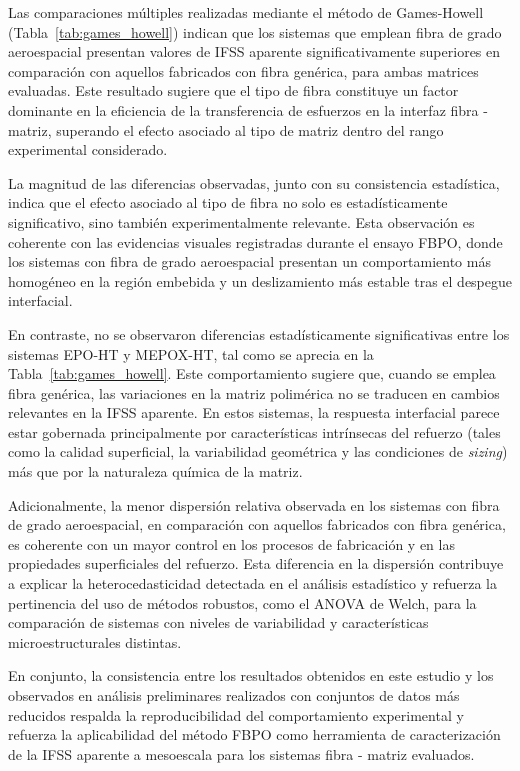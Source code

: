 Las comparaciones múltiples realizadas mediante el método de Games-Howell
(Tabla~\ref{tab:games_howell}) indican que los sistemas que emplean fibra de grado aeroespacial
presentan valores de IFSS aparente significativamente superiores en comparación con aquellos
fabricados con fibra genérica, para ambas matrices evaluadas. Este resultado sugiere que el tipo
de fibra constituye un factor dominante en la eficiencia de la transferencia de esfuerzos en la
interfaz fibra - matriz, superando el efecto asociado al tipo de matriz dentro del rango
experimental considerado.

La magnitud de las diferencias observadas, junto con su consistencia estadística, indica que el
efecto asociado al tipo de fibra no solo es estadísticamente significativo, sino también
experimentalmente relevante. Esta observación es coherente con las evidencias visuales
registradas durante el ensayo FBPO, donde los sistemas con fibra de grado aeroespacial presentan
un comportamiento más homogéneo en la región embebida y un deslizamiento más estable tras el
despegue interfacial.

En contraste, no se observaron diferencias estadísticamente significativas entre los sistemas
EPO-HT y MEPOX-HT, tal como se aprecia en la Tabla~\ref{tab:games_howell}. Este
comportamiento sugiere que, cuando se emplea fibra genérica, las variaciones en la matriz
polimérica no se traducen en cambios relevantes en la IFSS aparente. En estos sistemas, la
respuesta interfacial parece estar gobernada principalmente por características intrínsecas del
refuerzo (tales como la calidad superficial, la variabilidad geométrica y las condiciones de
\textit{sizing}) más que por la naturaleza química de la matriz.

Adicionalmente, la menor dispersión relativa observada en los sistemas con fibra de grado
aeroespacial, en comparación con aquellos fabricados con fibra genérica, es coherente con un
mayor control en los procesos de fabricación y en las propiedades superficiales del refuerzo.
Esta diferencia en la dispersión contribuye a explicar la heterocedasticidad detectada en el
análisis estadístico y refuerza la pertinencia del uso de métodos robustos, como el ANOVA de
Welch, para la comparación de sistemas con niveles de variabilidad y características
microestructurales distintas.

En conjunto, la consistencia entre los resultados obtenidos en este estudio y los observados en
análisis preliminares realizados con conjuntos de datos más reducidos respalda la
reproducibilidad del comportamiento experimental y refuerza la aplicabilidad del método FBPO
como herramienta de caracterización de la IFSS aparente a mesoescala para los sistemas
fibra - matriz evaluados.

